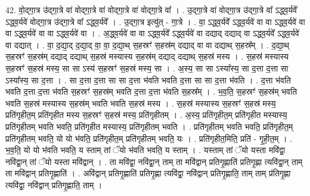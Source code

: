 \documentclass[17pt]{extarticle}
\begin{document}
42. वो॒द्‍गा॒त्र उ॑द्‍गा॒त्रे वा॑ वोद्‍गा॒त्रे वा॑ वोद्‍गा॒त्रे वा॑ वोद्‍गा॒त्रे वा᳚ । . उ॒द्‍गा॒त्रे वा॑ वोद्‍गा॒त्र उ॑द्‍गा॒त्रे वा᳚ ऽद्ध्व॒र्यवे᳚ ऽद्ध्व॒र्यवे॑ वोद्‍गा॒त्र उ॑द्‍गा॒त्रे वा᳚ ऽद्ध्व॒र्यवे᳚ । . उ॒द्‍गा॒त्र इत्यु॑त् - गा॒त्रे । . वा॒ ऽद्ध्व॒र्यवे᳚ ऽद्ध्व॒र्यवे॑ वा वा ऽद्ध्व॒र्यवे॑ वा वा ऽद्ध्व॒र्यवे॑ वा वा ऽद्ध्व॒र्यवे॑ वा । . अ॒द्ध्व॒र्यवे॑ वा वा ऽद्ध्व॒र्यवे᳚ ऽद्ध्व॒र्यवे॑ वा दद्याद् दद्याद् वा ऽद्ध्व॒र्यवे᳚ ऽद्ध्व॒र्यवे॑ वा दद्यात् । . वा॒ द॒द्या॒द् द॒द्या॒द् वा॒ वा॒ द॒द्या॒थ् स॒हस्रꣳ॑ स॒हस्र॑म् दद्याद् वा वा दद्याथ् स॒हस्र᳚म् । . द॒द्या॒थ् स॒हस्रꣳ॑ स॒हस्र॑म् दद्याद् दद्याथ् स॒हस्र॑ मस्यास्य स॒हस्र॑म् दद्याद् दद्याथ् स॒हस्र॑ मस्य । . स॒हस्र॑ मस्यास्य स॒हस्रꣳ॑ स॒हस्र॑ मस्य॒ सा सा ऽस्य॑ स॒हस्रꣳ॑ स॒हस्र॑ मस्य॒ सा । . अ॒स्य॒ सा सा ऽस्या᳚स्य॒ सा द॒त्ता द॒त्ता सा ऽस्या᳚स्य॒ सा द॒त्ता । . सा द॒त्ता द॒त्ता सा सा द॒त्ता भ॑वति भवति द॒त्ता सा सा द॒त्ता भ॑वति । . द॒त्ता भ॑वति भवति द॒त्ता द॒त्ता भ॑वति स॒हस्रꣳ॑ स॒हस्र॑म् भवति द॒त्ता द॒त्ता भ॑वति स॒हस्र᳚म् । . भ॒व॒ति॒ स॒हस्रꣳ॑ स॒हस्र॑म् भवति भवति स॒हस्र॑ मस्यास्य स॒हस्र॑म् भवति भवति स॒हस्र॑ मस्य । . स॒हस्र॑ मस्यास्य स॒हस्रꣳ॑ स॒हस्र॑ मस्य॒ प्रति॑गृहीत॒म् प्रति॑गृहीत मस्य स॒हस्रꣳ॑ स॒हस्र॑ मस्य॒ प्रति॑गृहीतम् । . अ॒स्य॒ प्रति॑गृहीत॒म् प्रति॑गृहीत मस्यास्य॒ प्रति॑गृहीतम् भवति भवति॒ प्रति॑गृहीत मस्यास्य॒ प्रति॑गृहीतम् भवति । . प्रति॑गृहीतम् भवति भवति॒ प्रति॑गृहीत॒म् प्रति॑गृहीतम् भवति॒ यो यो भ॑वति॒ प्रति॑गृहीत॒म् प्रति॑गृहीतम् भवति॒ यः । . प्रति॑गृहीत॒मिति॒ प्रति॑ - गृ॒ही॒त॒म् । . भ॒व॒ति॒ यो यो भ॑वति भवति॒ य स्ताम् तां ॅयो भ॑वति भवति॒ य स्ताम् । . यस्ताम् तां ॅयो यस्ता मवि॑द्वा॒ नवि॑द्वा॒न् तां ॅयो यस्ता मवि॑द्वान् । . ता मवि॑द्वा॒ नवि॑द्वा॒न् ताम् ता मवि॑द्वान् प्रतिगृ॒ह्णाति॑ प्रतिगृ॒ह्णा त्यवि॑द्वा॒न् ताम् ता मवि॑द्वान् प्रतिगृ॒ह्णाति॑ । . अवि॑द्वान् प्रतिगृ॒ह्णाति॑ प्रतिगृ॒ह्णा त्यवि॑द्वा॒ नवि॑द्वान् प्रतिगृ॒ह्णाति॒ ताम् ताम् प्र॑तिगृ॒ह्णा त्यवि॑द्वा॒ नवि॑द्वान् प्रतिगृ॒ह्णाति॒ ताम् । \newline
\pagebreak
{}
\end{document}
